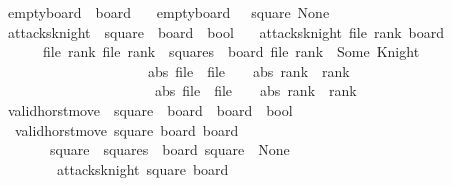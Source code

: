\begin{isabellebody}
\ empty{\isacharunderscore}board\ {\isacharcolon}{\isacharcolon}\ board\ \isanewline
\ \ {\isachardoublequoteopen}empty{\isacharunderscore}board\ {\isacharequal}\ {\isacharparenleft}{\isasymlambda}\ square{\isachardot}\ None{\isacharparenright}{\isachardoublequoteclose}\isanewline
\isanewline
{}\isamarkupfalse%
\ attacks{\isacharunderscore}knight\ {\isacharcolon}{\isacharcolon}\ {\isachardoublequoteopen}square\ {\isasymRightarrow}\ board\ {\isasymRightarrow}\ bool{\isachardoublequoteclose}\ \isanewline
\ \ {\isachardoublequoteopen}attacks{\isacharunderscore}knight\ {\isacharparenleft}file{\isacharcomma}\ rank{\isacharparenright}\ board\ {\isasymlongleftrightarrow}\ \isanewline
\ \ \ \ \ {\isacharparenleft}{\isasymexists}\ file{\isacharprime}\ rank{\isacharprime}{\isachardot}\ {\isacharparenleft}file{\isacharprime}{\isacharcomma}\ rank{\isacharprime}{\isacharparenright}\ {\isasymin}\ squares\ {\isasymand}\ board\ {\isacharparenleft}file{\isacharprime}{\isacharcomma}\ rank{\isacharprime}{\isacharparenright}\ {\isacharequal}\ Some\ Knight\ {\isasymand}\ \isanewline
\ \ \ \ \ \ \ \ \ \ \ \ \ \ \ \ \ \ \ \ \ {\isacharparenleft}{\isacharparenleft}abs\ {\isacharparenleft}file\ {\isacharminus}\ file{\isacharprime}{\isacharparenright}\ {\isacharequal}\ {}\ {\isasymand}\ abs\ {\isacharparenleft}rank\ {\isacharminus}\ rank{\isacharprime}{\isacharparenright}\ {\isacharequal}\ {}{\isacharparenright}\ {\isasymor}\isanewline
\ \ \ \ \ \ \ \ \ \ \ \ \ \ \ \ \ \ \ \ \ \ {\isacharparenleft}abs\ {\isacharparenleft}file\ {\isacharminus}\ file{\isacharprime}{\isacharparenright}\ {\isacharequal}\ {}\ {\isasymand}\ abs\ {\isacharparenleft}rank\ {\isacharminus}\ rank{\isacharprime}{\isacharparenright}\ {\isacharequal}\ {}{\isacharparenright}{\isacharparenright}{\isacharparenright}{\isachardoublequoteclose}\isanewline
\isanewline
{}\isamarkupfalse%
\ valid{\isacharunderscore}horst{\isacharunderscore}move{\isacharprime}\ {\isacharcolon}{\isacharcolon}\ {\isachardoublequoteopen}square\ {\isasymRightarrow}\ board\ {\isasymRightarrow}\ board\ {\isasymRightarrow}\ bool{\isachardoublequoteclose}\ \isanewline
\ \ {\isachardoublequoteopen}valid{\isacharunderscore}horst{\isacharunderscore}move{\isacharprime}\ square\ board\ board{\isacharprime}\ {\isasymlongleftrightarrow}\ \isanewline
\ \ \ \ \ \ \ square\ {\isasymin}\ squares\ {\isasymand}\ board\ square\ {\isacharequal}\ None\ {\isasymand}\isanewline
\ \ \ \ \ \ \ {\isasymnot}\ attacks{\isacharunderscore}knight\ square\ board\ {\isasymand}\ \isanewline

\end{isabellebody}

